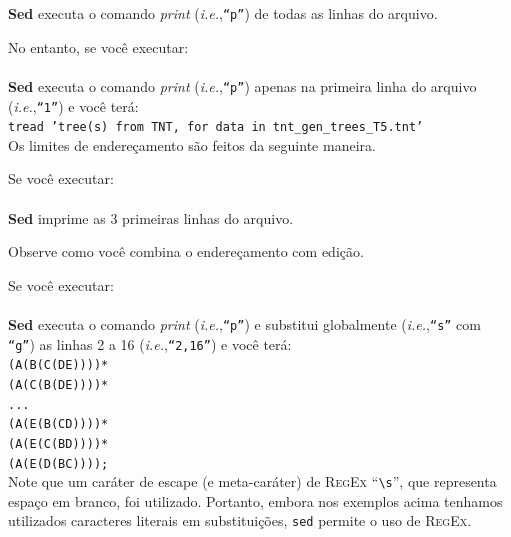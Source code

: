\begin{refsection}
\textbf{Sed} executa o comando \textit{print} (\textit{i.e.},\texttt{``p''}) de todas as linhas do arquivo.

No entanto, se você executar:\\

\\

\textbf{Sed} executa o comando \textit{print} (\textit{i.e.},\texttt{``p''}) apenas na primeira linha do arquivo (\textit{i.e.},\texttt{``1''}) e você terá:\\

\texttt{tread 'tree(s) from TNT, for data in tnt\_gen\_trees\_T5.tnt'}\\

Os limites de endereçamento são feitos da seguinte maneira.

Se você executar:\\

\\

\textbf{Sed} imprime as 3 primeiras linhas do arquivo.

Observe como você combina o endereçamento com edição.

Se você executar:\\

\\

\textbf{Sed} executa o comando \textit{print} (\textit{i.e.},\texttt{``p''}) e substitui globalmente (\textit{i.e.},\texttt{``s''} com \texttt{``g''}) as linhas 2 a 16 (\textit{i.e.},\texttt{``2,16''}) e você terá:\\

\noindent\texttt{(A(B(C(DE))))*}\\
\texttt{(A(C(B(DE))))*}\\
\texttt{...}\\
\texttt{(A(E(B(CD))))*}\\
\texttt{(A(E(C(BD))))*}\\
\texttt{(A(E(D(BC))));}\\

Note que um caráter de escape (e meta-caráter) de \textsc{RegEx} ``\texttt{\textbackslash s}'', que representa espaço em branco, foi utilizado. Portanto, embora nos exemplos acima tenhamos utilizados caracteres literais em substituições, \texttt{sed} permite o uso de \textsc{RegEx}.


\end{refsection}

